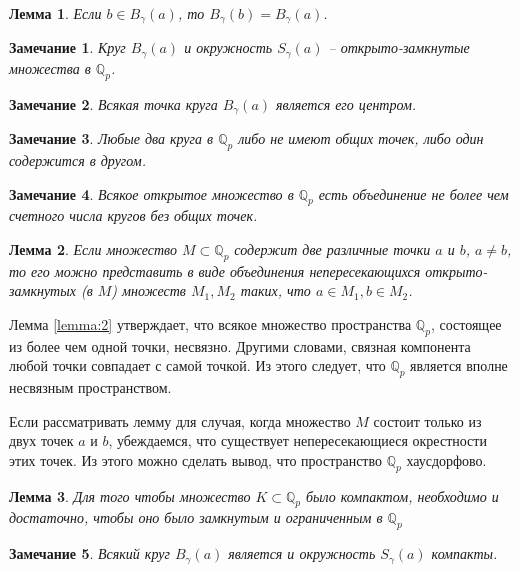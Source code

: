 \documentclass[master, och, diploma, times]{sty/SCWorks}
\theoremstyle{plain}
\newtheorem{lemma}{Лемма}[section]
\newtheorem{note}{Замечание}[section]
\theoremstyle{definition}
\begin{document}
\begin{lemma}
Если $b \in B_{\gamma}(a)$, то $B_{\gamma}(b)=B_{\gamma}(a)$.
\end{lemma}

\begin{note}
Круг $B_{\gamma}(a)$ и окружность $S_{\gamma}(a)$ -- открыто-замкнутые множества в $\mathbb {Q}_p$.
\end{note}

\begin{note}
Всякая точка круга $B_{\gamma}(a)$ является его центром.
\end{note}

\begin{note}
Любые два круга в $\mathbb {Q}_p$ либо не имеют общих точек, либо один содержится в другом.
\end{note}

\begin{note}
Всякое открытое множество в $\mathbb {Q}_p$ есть объединение не более чем счетного числа кругов без общих точек.
\end{note}

\begin{lemma} \label{lemma:2}
Если множество $M \subset \mathbb {Q}_p$ содержит две различные точки $a$ и $b$, $a \ne b$, то его можно представить в виде объединения непересекающихся открыто-замкнутых (в $M$) множеств $M_1, M_2$ таких, что $a \in M_1, b \in M_2$.
\end{lemma}

Лемма \eqref{lemma:2} утверждает, что всякое множество пространства $\mathbb {Q}_p$, состоящее из более чем одной точки, несвязно. Другими словами, связная компонента любой точки совпадает с самой точкой. Из этого следует, что $\mathbb {Q}_p$ является вполне несвязным пространством.

Если рассматривать лемму для случая, когда множество $M$ состоит только из двух точек $a$ и $b$, убеждаемся, что существует непересекающиеся окрестности этих точек. Из этого можно сделать вывод, что пространство $\mathbb {Q}_p$ хаусдорфово.

\begin{lemma}
Для того чтобы множество $K \subset \mathbb {Q}_p$ было компактом, необходимо и достаточно, чтобы оно было замкнутым и ограниченным в $\mathbb {Q}_p$
\end{lemma}

\begin{note}
Всякий круг $B_{\gamma}(a)$ является и окружность $S_{\gamma}(a)$ компакты.
\end{note}
\end{document}
